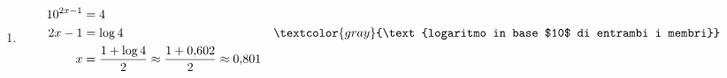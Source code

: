 \begin{question}[ID=1.5, subtitle={Esercizi avanzati sulle potenze}, tags={potenze, esercizi misti}, difficulty=difficile]
\begin{explanation}
\begin{enumerate}
\[\begin{aligned}
    \dfrac{3^{-4}a^6b^{-2}}{3^{-3}a^2b^{-2}} &= 3^{-4+3}a^{6-2}b^{-2+2} && \textcolor{gray}{\text{sottraggo gli esponenti}}\\
    &= 3^{-1}a^4b^0=\dfrac{a^4}{3}
    \end{aligned}\]
    \item \[\begin{aligned}
    10^{2x-1} &= 4\\
    2x-1 &= \log4 && \textcolor{gray}{\text{logaritmo in base $10$ di entrambi i membri}}\\
    x &= \dfrac{1+\log4}{2}\approx\dfrac{1+0{,}602}{2}\approx0{,}801
    \end{aligned}\]
\end{enumerate}
\end{explanation}
\end{question}





